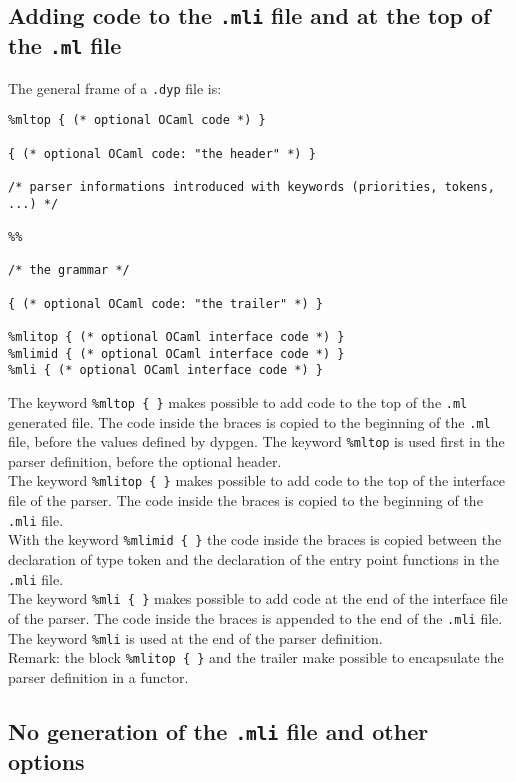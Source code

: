 \documentclass[12pt]{article}
\begin{document}
{\subsection{Adding code to the \texttt{.mli} file and at the top of the \texttt{.ml} file}\label{mli}

The general frame of a \verb|.dyp| file is:
\begin{verbatim}
%mltop { (* optional OCaml code *) }

{ (* optional OCaml code: "the header" *) }

/* parser informations introduced with keywords (priorities, tokens, ...) */

%%

/* the grammar */

{ (* optional OCaml code: "the trailer" *) }

%mlitop { (* optional OCaml interface code *) }
%mlimid { (* optional OCaml interface code *) }
%mli { (* optional OCaml interface code *) }
\end{verbatim}

The keyword \verb|%mltop { }| makes possible to add code to the top of the \verb|.ml| generated file. The code inside the braces is copied to the beginning of the \texttt{.ml} file, before the values defined by dypgen. The keyword \verb|%mltop| is used first in the parser definition, before the optional header.\\

The keyword \verb|%mlitop { }| makes possible to add code to the top of the interface file of the parser. The code inside the braces is copied to the beginning of the \texttt{.mli} file.\\

With the keyword \verb|%mlimid { }| the code inside the braces is copied between the declaration of type token and the declaration of the entry point functions in the \verb|.mli| file.\\

The keyword \verb|%mli { }| makes possible to add code at the end of the interface file of the parser. The code inside the braces is appended to the end of the \texttt{.mli} file. The keyword \verb|%mli| is used at the end of the parser definition.\\

Remark: the block \verb|%mlitop { }| and the trailer make possible to encapsulate the parser definition in a functor.

\subsection{No generation of the \texttt{.mli} file and other options}

}
\end{document}
